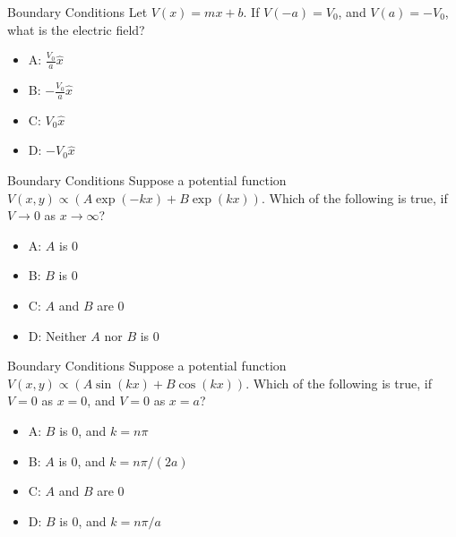 \documentclass{beamer}
\begin{document}
\begin{frame}{Boundary Conditions}
Let $V(x) = m x + b$.  If $V(-a) = V_0$, and $V(a) = -V_0$, what is the electric field?
\begin{itemize}
\item A: $\frac{V_0}{a} \hat{x}$
\item B: $-\frac{V_0}{a} \hat{x}$
\item C: $V_0 \hat{x}$
\item D: $-V_0 \hat{x}$
\end{itemize}
\end{frame}

\begin{frame}{Boundary Conditions}
Suppose a potential function $V(x,y) \propto \left(A\exp(-kx) + B\exp(kx)\right)$.  Which of the following is true, if $V \to 0$ as $x \to \infty$?
\begin{itemize}
\item A: $A$ is 0
\item B: $B$ is 0
\item C: $A$ and $B$ are 0
\item D: Neither $A$ nor $B$ is 0
\end{itemize}
\end{frame}

\begin{frame}{Boundary Conditions}
Suppose a potential function $V(x,y) \propto \left(A\sin(kx) + B\cos(kx)\right)$.  Which of the following is true, if $V = 0$ as $x = 0$, and $V = 0$ as $x = a$?
\begin{itemize}
\item A: $B$ is 0, and $k = n\pi$
\item B: $A$ is 0, and $k = n\pi/(2a)$
\item C: $A$ and $B$ are 0
\item D: $B$ is 0, and $k = n\pi/a$
\end{itemize}
\end{frame}
\end{document}
